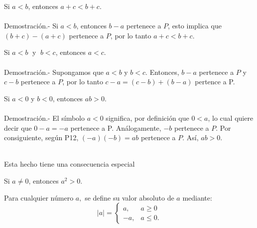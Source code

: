 \begin{lema}
    Si $a<b$, entonces $a+c<b+c$.\\\\
	Demostración.-\; Si $a<b$, entonces $b-a$ pertenece a $P$, esto implica que $(b+c)-(a+c)$ pertenece a $P$, por lo tanto $a+c<b+c$.
\end{lema}

\begin{lema}
    Si $a<b\;$ y $\;b<c$, entonces $a<c$.\\\\
	Demostración.-\; Supongamos que $a<b$ y $b<c$. Entonces, $b-a$ pertenece a $P$ y $c-b$ pertenece a $P$, por lo tanto $c-a=(c-b)+(b-a)$ pertence a P.
\end{lema}

\begin{lema}
    Si $a<0$ y $b<0$, entonces $ab>0$.\\\\
	Demostración.-\; El símbolo $a<0$ significa, por definición que $0<a$, lo cual quiere decir que $0-a=-a$ pertenece a P. Análogamente, $-b$ pertenece a $P$. Por consiguiente, según P12, $(-a)(-b)=ab$ pertenece a $P$. Así, $ab>0$.\\\\
\end{lema}
Esta hecho tiene una consecuencia especial 

\begin{lema}
    Si $a\neq 0$, entonces $a^2>0$. 
\end{lema}

\begin{def.}
    Para cualquier número $a,$ se define su valor absoluto de $a$ mediante:
    $$
    |a|=\left\{
	\begin{array}{rl}
	    a, & a\geq 0\\
	    -a, & a\leq 0.
	\end{array}
    \right.
    $$
\end{def.}


